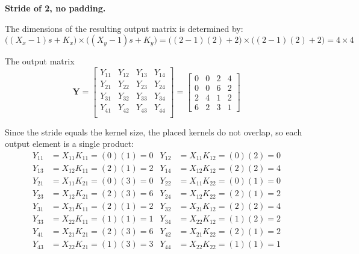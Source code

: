 \documentclass{cisXXX} %
\begin{document}
\HWsubproblem
\textbf{Stride of 2, no padding.}

The dimensions of the resulting output matrix is determined by:
$$ \big((X_x - 1)s + K_x\big) \times \big((X_y - 1)s + K_y\big) = \big((2-1)(2)+2\big) \times \big((2-1)(2)+2\big) = 4 \times 4 $$

The output matrix $$\mathbf{Y} = \begin{bmatrix}
    Y_{11}&Y_{12}&Y_{13}&Y_{14}\\
    Y_{21}&Y_{22}&Y_{23}&Y_{24}\\
    Y_{31}&Y_{32}&Y_{33}&Y_{34}\\
    Y_{41}&Y_{42}&Y_{43}&Y_{44}\\
\end{bmatrix} = \begin{bmatrix}
    0 & 0 & 2 & 4 \\
    0 & 0 & 6 & 2 \\
    2 & 4 & 1 & 2 \\
    6 & 2 & 3 & 1
\end{bmatrix}$$

Since the stride equals the kernel size, the placed kernels do not overlap, so each output element is a single product:
\begin{align*}
Y_{11} &= X_{11}K_{11} = (0)(1) = 0 & Y_{12} &= X_{11}K_{12} = (0)(2) = 0 \\
Y_{13} &= X_{12}K_{11} = (2)(1) = 2 & Y_{14} &= X_{12}K_{12} = (2)(2) = 4 \\
Y_{21} &= X_{11}K_{21} = (0)(3) = 0 & Y_{22} &= X_{11}K_{22} = (0)(1) = 0 \\
Y_{23} &= X_{12}K_{21} = (2)(3) = 6 & Y_{24} &= X_{12}K_{22} = (2)(1) = 2 \\
Y_{31} &= X_{21}K_{11} = (2)(1) = 2 & Y_{32} &= X_{21}K_{12} = (2)(2) = 4 \\
Y_{33} &= X_{22}K_{11} = (1)(1) = 1 & Y_{34} &= X_{22}K_{12} = (1)(2) = 2 \\
Y_{41} &= X_{21}K_{21} = (2)(3) = 6 & Y_{42} &= X_{21}K_{22} = (2)(1) = 2 \\
Y_{43} &= X_{22}K_{21} = (1)(3) = 3 & Y_{44} &= X_{22}K_{22} = (1)(1) = 1
\end{align*}
\end{document}
